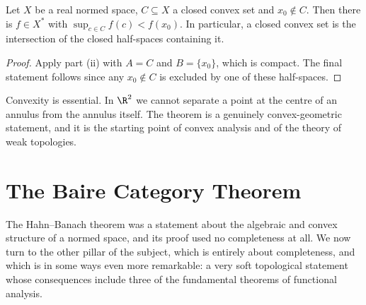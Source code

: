 \begin{center}
\end{center}

\begin{corollary}
	Let $X$ be a real normed space, $C \subseteq X$ a closed convex set and $x_0 \notin C$. Then there is $f \in X^*$ with $\sup_{c \in C} f(c) < f(x_0)$. In particular, a closed convex set is the intersection of the closed half-spaces containing it.
\end{corollary}

\begin{proof}
	Apply part (ii) with $A = C$ and $B = \{x_0\}$, which is compact. The final statement follows since any $x_0 \notin C$ is excluded by one of these half-spaces.
\end{proof}

\begin{remark}
	Convexity is essential. In $\R^2$ we cannot separate a point at the centre of an annulus from the annulus itself. The theorem is a genuinely convex-geometric statement, and it is the starting point of convex analysis and of the theory of weak topologies.
\end{remark}

\section{The Baire Category Theorem}

The Hahn--Banach theorem was a statement about the algebraic and convex structure of a normed space, and its proof used no completeness at all. We now turn to the other pillar of the subject, which is entirely about completeness, and which is in some ways even more remarkable: a very soft topological statement whose consequences include three of the fundamental theorems of functional analysis.

